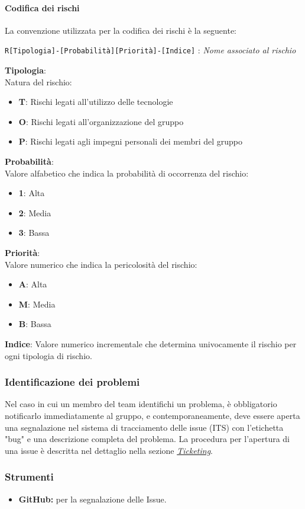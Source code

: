 \paragraph{Codifica dei rischi}
La convenzione utilizzata per la codifica dei rischi è la seguente: 
\begin{center}
    \texttt{R[Tipologia]-[Probabilità][Priorità]-[Indice]} : \textit{Nome associato al rischio}
\end{center} 

\begin{flushleft}
    \textbf{Tipologia}: \\
    Natura del rischio:
    \begin{itemize}
        \item \textbf{T}: Rischi legati all'utilizzo delle tecnologie
        \item \textbf{O}: Rischi legati all'organizzazione del gruppo
        \item \textbf{P}: Rischi legati agli impegni personali dei membri del gruppo
    \end{itemize}
    \textbf{Probabilità}: \\
    Valore alfabetico che indica la probabilità di occorrenza del rischio:
    \begin{itemize}
        \item \textbf{1}: Alta
        \item \textbf{2}: Media
        \item \textbf{3}: Bassa
    \end{itemize}
    \textbf{Priorità}: \\
    Valore numerico che indica la pericolosità del rischio:
    \begin{itemize}
        \item \textbf{A}: Alta
        \item \textbf{M}: Media
        \item \textbf{B}: Bassa
    \end{itemize}
    \textbf{Indice}: Valore numerico incrementale che determina univocamente il rischio per ogni tipologia di rischio. 
\end{flushleft}
\subsubsection{Identificazione dei problemi}
Nel caso in cui un membro del team identifichi un problema, è obbligatorio notificarlo immediatamente al gruppo, e contemporaneamente, deve essere aperta una segnalazione nel sistema di tracciamento delle issue (ITS) con l'etichetta "bug" e una descrizione completa del problema. La procedura per l'apertura di una issue è descritta nel dettaglio nella sezione \hyperlink{par:ticketing}{\textit{Ticketing}}.

\subsubsection{Strumenti}
\begin{itemize}
    \item \textbf{GitHub:} per la segnalazione delle Issue.
\end{itemize}